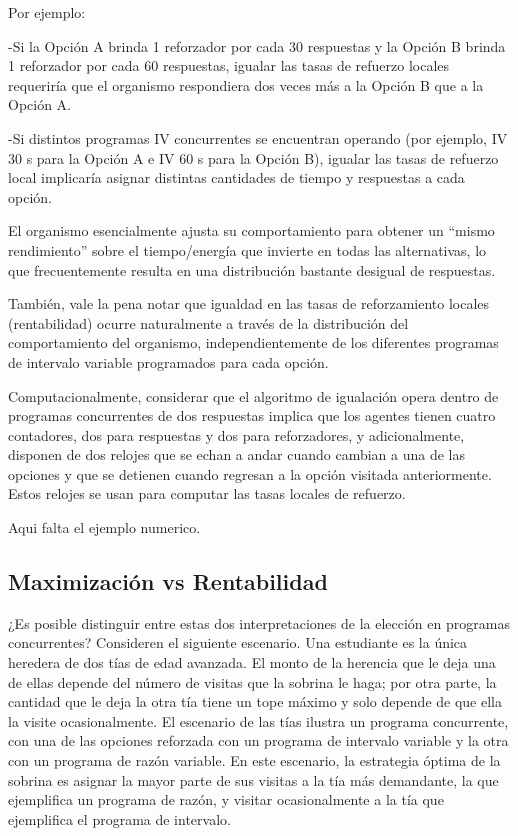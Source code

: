 \documentclass[
  letterpaper,
]{book}
\begin{document}
Por ejemplo:

-Si la Opción A brinda 1 reforzador por cada 30 respuestas y la Opción B
brinda 1 reforzador por cada 60 respuestas, igualar las tasas de
refuerzo locales requeriría que el organismo respondiera dos veces más a
la Opción B que a la Opción A.

-Si distintos programas IV concurrentes se encuentran operando (por
ejemplo, IV 30 s para la Opción A e IV 60 s para la Opción B), igualar
las tasas de refuerzo local implicaría asignar distintas cantidades de
tiempo y respuestas a cada opción.

El organismo esencialmente ajusta su comportamiento para obtener un
``mismo rendimiento'' sobre el tiempo/energía que invierte en todas las
alternativas, lo que frecuentemente resulta en una distribución bastante
desigual de respuestas.

También, vale la pena notar que igualdad en las tasas de reforzamiento
locales (rentabilidad) ocurre naturalmente a través de la distribución
del comportamiento del organismo, independientemente de los diferentes
programas de intervalo variable programados para cada opción.

Computacionalmente, considerar que el algoritmo de igualación opera
dentro de programas concurrentes de dos respuestas implica que los
agentes tienen cuatro contadores, dos para respuestas y dos para
reforzadores, y adicionalmente, disponen de dos relojes que se echan a
andar cuando cambian a una de las opciones y que se detienen cuando
regresan a la opción visitada anteriormente. Estos relojes se usan para
computar las tasas locales de refuerzo.

Aqui falta el ejemplo numerico.

\subsection{Maximización vs
Rentabilidad}\label{maximizaciuxf3n-vs-rentabilidad}

¿Es posible distinguir entre estas dos interpretaciones de la elección
en programas concurrentes? Consideren el siguiente escenario. Una
estudiante es la única heredera de dos tías de edad avanzada. El monto
de la herencia que le deja una de ellas depende del número de visitas
que la sobrina le haga; por otra parte, la cantidad que le deja la otra
tía tiene un tope máximo y solo depende de que ella la visite
ocasionalmente. El escenario de las tías ilustra un programa
concurrente, con una de las opciones reforzada con un programa de
intervalo variable y la otra con un programa de razón variable. En este
escenario, la estrategia óptima de la sobrina es asignar la mayor parte
de sus visitas a la tía más demandante, la que ejemplifica un programa
de razón, y visitar ocasionalmente a la tía que ejemplifica el programa
de intervalo.
\end{document}
